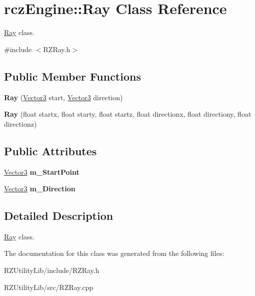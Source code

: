 \hypertarget{classrcz_engine_1_1_ray}{}\section{rcz\+Engine\+:\+:Ray Class Reference}
\label{classrcz_engine_1_1_ray}


\hyperlink{classrcz_engine_1_1_ray}{Ray} class.  




{\ttfamily \#include $<$R\+Z\+Ray.\+h$>$}

\subsection*{Public Member Functions}
\begin{DoxyCompactItemize}
\item 
\hypertarget{classrcz_engine_1_1_ray_a12bb8af4b5289d8acdb2766d1441b628}{}{\bfseries Ray} (\hyperlink{classrcz_engine_1_1_vector3}{Vector3} start, \hyperlink{classrcz_engine_1_1_vector3}{Vector3} direction)\label{classrcz_engine_1_1_ray_a12bb8af4b5289d8acdb2766d1441b628}

\item 
\hypertarget{classrcz_engine_1_1_ray_a5e6013bee62d6ee4267c707459c4629f}{}{\bfseries Ray} (float startx, float starty, float startz, float directionx, float directiony, float directionz)\label{classrcz_engine_1_1_ray_a5e6013bee62d6ee4267c707459c4629f}

\end{DoxyCompactItemize}
\subsection*{Public Attributes}
\begin{DoxyCompactItemize}
\item 
\hypertarget{classrcz_engine_1_1_ray_af76d5b1297ace446dee3e07e7823157e}{}\hyperlink{classrcz_engine_1_1_vector3}{Vector3} {\bfseries m\+\_\+\+Start\+Point}\label{classrcz_engine_1_1_ray_af76d5b1297ace446dee3e07e7823157e}

\item 
\hypertarget{classrcz_engine_1_1_ray_a176e4ea65628d77a2274e622dd7797a3}{}\hyperlink{classrcz_engine_1_1_vector3}{Vector3} {\bfseries m\+\_\+\+Direction}\label{classrcz_engine_1_1_ray_a176e4ea65628d77a2274e622dd7797a3}

\end{DoxyCompactItemize}


\subsection{Detailed Description}
\hyperlink{classrcz_engine_1_1_ray}{Ray} class. 

The documentation for this class was generated from the following files\+:\begin{DoxyCompactItemize}
\item 
R\+Z\+Utility\+Lib/include/R\+Z\+Ray.\+h\item 
R\+Z\+Utility\+Lib/src/R\+Z\+Ray.\+cpp\end{DoxyCompactItemize}
